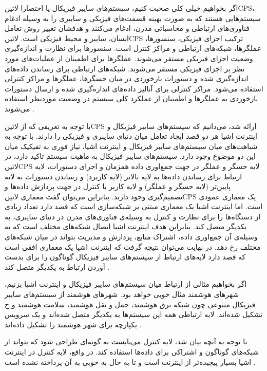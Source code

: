 اگر بخواهیم خیلی کلی صحبت کنیم، سیستم‌های سایبر فیزیکال یا اختصارا ‌لاتین{CPS}، سیستم‌هایی هستند که به صورت بهینه قسمت‌های فیزیکی و سایبری را به وسیله ادغام فناوری‌های ارتباطی و محاسباتی مدرن،
ادغام می‌کنند و هدفشان تغییر روش تعامل انسان، سایبر و محیط فیزیکی است.
‌لاتین{CPS} ترکیب اجزای فیزیکی، سنسورها، عملگرها، شبکه‌های ارتباطی و مراکز کنترل است. سنسورها برای نظارت و اندازه‌گیری وضعیت اجزای فیزیکی مستقر می‌شوند.
عملگرها برای اطمینان از عملیات‌های مورد نظر بر اجزای فیزیکی مستقر می‌شوند. شبکه‌های ارتباطی برای رساندن داده‌های اندازه‌گیری شده و دستورات بازخوردی در میان حسگرها، عملگرها و مراکز کنترلی استفاده می‌شود.
مراکز کنترلی برای آنالیز داده‌های اندازه‌گیری شده و ارسال دستورات بازخوردی به عملگرها و اطمینان از عملکرد کلی سیستم در وضعیت موردنظر استفاده می‌شوند
.

با توجه به تعریفی که از ‌لاتین{CPS} ارائه شد، می‌دانیم که سیستم‌های سایبر فیزیکال و اینترنت اشیا هر دو قصد ایجاد تعامل میان دنیای سایبری و فیزیکی را دارند.
با توجه به شباهت‌های میان سیستم‌های سایبر فیزیکال و اینترنت اشیا، نیاز فوری به تفیکیک میان این دو موضوع وجود دارد.
سیستم‌های سایبر فیزیکال به ماهیت سیستم تاکید دارد، در ‌لاتین{CPS} لایه حسگر و عملگر در جهت جمع‌اوری داده همزمان و اجرای دستورات،
لایه ارتباط برای رساندن داده‌ها به لایه بالاتر (لایه کاربرد) و رساندن دستورات به لایه پایین‌تر (لایه حسگر و عملگر) و لایه کاربر یا کنترل در جهت پردازش داده‌ها
و تصمیم‌گیری وجود دارند. بنابراین می‌توان گفت معماری ‌لاتین{CPS} یک معماری عمودی است.
اما اینترنت اشیا یک معماری مبتنی بر شبکه‌سازی است که قصد دارد تعداد زیادی از دستگاه‌ها را برای نظارت و کنترل به وسیله‌ی فناوری‌های مدرن در دنیای سایبری، به یکدیگر متصل کند.
بنابراین هدف اینترنت اشیا اتصال شبکه‌های مختلف است که به وسیله‌ی آن جمع‌اوری داده، اشتراک منابع، پردازش و مدیریت بتواند در میان شبکه‌های مختلف رخ دهد.
در نهایت می‌توان نتیجه گرفت که اینترنت اشیا یک معماری افقی است که قصد دارد لایه‌های ارتباط از سیستم‌های سایبر فیزیکال گوناگون را برای بدست آوردن ارتباط به یکدیگر متصل کند
.

اگر بخواهیم مثالی از ارتباط میان سیستم‌های سایبر فیزیکال و اینترنت اشیا بزنیم، شهرهای هوشمند مثال خوبی خواهد بود. شهرهای هوشمند از سیستم‌های سایبر فیزیکال متنوعی چون
شبکه برق هوشمند، حمل و نقل هوشمند، سلامت هوشمند و ‌خ تشکیل شده‌اند. لایه ارتباطی همه این سیستم‌ها به یکدیگر متصل شده‌اند و یک سرویس یکپارچه برای شهر هوشمند را
تشکیل داده‌اند
.

با توجه به آنچه بیان شد، لایه کنترل می‌بایست به گونه‌ای طراحی شود که بتواند از شبکه‌های گوناگون و اشتراکی برای داده‌ها استفاده کند.
در واقع، لایه کنترل در اینترنت اشیا بسیار پیچیده‌تر از اینترنت است و تا به حال به خوبی به آن پرداخته نشده است
.

